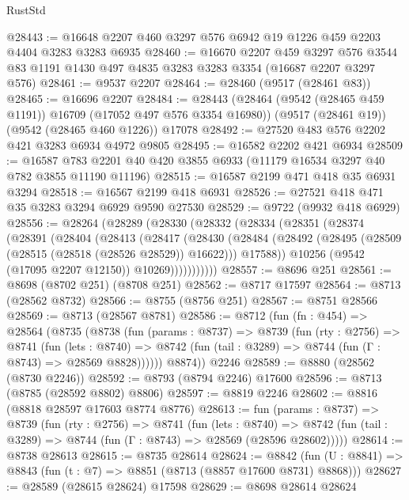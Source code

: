 \begin{lexlean}{RustStd}
\begin{coremodule}
@28443 := @16648 @2207 @460 @3297 @576 @6942 @19 @1226 @459 @2203 @4404 @3283 @3283 @6935
@28460 := @16670
    @2207
    @459
    @3297
    @576
    @3544
    @83
    @1191
    @1430
    @497
    @4835
    @3283
    @3283
    @3354
    (@16687 @2207 @3297 @576)
@28461 := @9537 @2207
@28464 := @28460 (@9517 (@28461 @83))
@28465 := @16696 @2207
@28484 := @28443
    (@28464 (@9542 (@28465 @459 @1191)) @16709 (@17052 @497 @576 @3354 @16980))
    (@9517 (@28461 @19))
    (@9542 (@28465 @460 @1226))
    @17078
@28492 := @27520 @483 @576 @2202 @421 @3283 @6934 @4972 @9805
@28495 := @16582 @2202 @421 @6934
@28509 := @16587 @783 @2201 @40 @420 @3855 @6933 (@11179 @16534 @3297 @40 @782 @3855 @11190 @11196)
@28515 := @16587 @2199 @471 @418 @35 @6931 @3294
@28518 := @16567 @2199 @418 @6931
@28526 := @27521 @418 @471 @35 @3283 @3294 @6929 @9590 @27530
@28529 := @9722 (@9932 @418 @6929)
@28556 := @28264
    (@28289
      (@28330
        (@28332
          (@28334
            (@28351
              (@28374
                (@28391
                  (@28404
                    (@28413
                      (@28417
                        (@28430
                          (@28484
                            (@28492
                              (@28495 (@28509 (@28515 (@28518 (@28526 @28529)) @16622)))
                              @17588))
                          @10256
                          (@9542 (@17095 @2207 @12150))
                          @10269)))))))))))
@28557 := @8696 @251
@28561 := @8698 (@8702 @251) (@8708 @251)
@28562 := @8717 @17597
@28564 := @8713 (@28562 @8732)
@28566 := @8755 (@8756 @251)
@28567 := @8751 @28566
@28569 := @8713 (@28567 @8781)
@28586 := @8712
    (fun (fn : @454) =>
    @28564
      (@8735
        (@8738
          (fun (params : @8737) =>
          @8739
            (fun (rty : @2756) =>
            @8741
              (fun (lets : @8740) =>
              @8742 (fun (tail : @3289) => @8744 (fun (Γ : @8743) => @28569 @8828))))))
        @8874))
    @2246
@28589 := @8880 (@28562 (@8730 @2246))
@28592 := @8793 (@8794 @2246) @17600
@28596 := @8713 (@8785 (@28592 @8802) @8806)
@28597 := @8819 @2246
@28602 := @8816 (@8818 @28597 @17603 @8774 @8776)
@28613 := fun (params : @8737) =>
  @8739
    (fun (rty : @2756) =>
    @8741
      (fun (lets : @8740) =>
      @8742 (fun (tail : @3289) => @8744 (fun (Γ : @8743) => @28569 (@28596 @28602)))))
@28614 := @8738 @28613
@28615 := @8735 @28614
@28624 := @8842
    (fun (U : @8841) => @8843 (fun (t : @7) => @8851 (@8713 (@8857 @17600 @8731) @8868)))
@28627 := @28589 (@28615 @28624) @17598
@28629 := @8698 @28614 @28624

\end{coremodule}
\end{lexlean}
